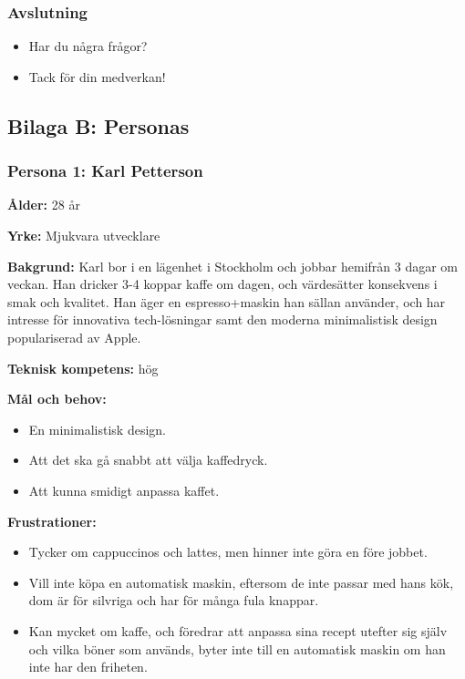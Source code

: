 \subsubsection{Avslutning}
\begin{itemize}
    \item Har du några frågor?
    \item Tack för din medverkan!
\end{itemize}


\subsection{Bilaga B: Personas}

\subsubsection{Persona 1: Karl Petterson}

\textbf{Ålder:} 28 år

\textbf{Yrke:} Mjukvara utvecklare 

\textbf{Bakgrund:} Karl bor i en lägenhet i Stockholm och jobbar hemifrån 3 dagar om veckan. Han dricker 3-4 koppar kaffe om dagen, och värdesätter konsekvens i smak och kvalitet. Han äger en espresso+maskin han sällan använder, och har intresse för innovativa tech-lösningar samt den moderna minimalistisk design populariserad av Apple. 

\textbf{Teknisk kompetens:} hög

\textbf{Mål och behov:}
\begin{itemize}
    \item En minimalistisk design. 
    \item Att det ska gå snabbt att välja kaffedryck.
    \item Att kunna smidigt anpassa kaffet. 
\end{itemize}

\textbf{Frustrationer:}
\begin{itemize}
    \item Tycker om cappuccinos och lattes, men hinner inte göra en före jobbet.
    \item Vill inte köpa en automatisk maskin, eftersom de inte passar med hans kök, dom är för silvriga och har för många fula knappar. 
    \item Kan mycket om kaffe, och föredrar att anpassa sina recept utefter sig själv och vilka böner som används, byter inte till en automatisk maskin om han inte har den friheten. 
\end{itemize}

